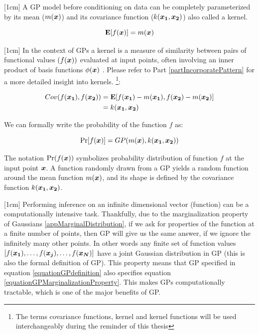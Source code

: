 [1cm]
A GP model before conditioning on data can be completely parameterized by its mean ($m(\boldsymbol{x})$) and its covariance function ($k(\boldsymbol{x_1}, \boldsymbol{x_2})$) also called a kernel. 

\begin{equation}\label{eq:meanGP}
\mathbf{E}[f(\boldsymbol{x})] = m(\boldsymbol{x})
\end{equation}

[1cm]
In the context of GPs a kernel is a measure of similarity between pairs of functional values $(f(\boldsymbol{x}))$ evaluated at input points, often involving an inner product of basis functions $\phi(\boldsymbol{x})$ \cite{bishop2006pattern}. Please refer to Part \ref{partIncorporatePattern} for a more detailed insight into kernels.   \footnote{The terms covariance functions, kernel and kernel functions will be used interchangeably during the reminder of this thesis}:

\begin{align}\label{eq:covarianceGP}
Cov(f(\boldsymbol{x_1}), f(\boldsymbol{x_2})) & = \mathbf{E}[f(\boldsymbol{x_1}) - m(\boldsymbol{x_1}), f(\boldsymbol{x_2}) - m(\boldsymbol{x_2})] \\
& = k(\boldsymbol{x_1}, \boldsymbol{x_2})
\end{align}

We can formally write the probability of the function $f$ as:

\begin{equation}\label{equationGPdefinition}
\Pr[f(\boldsymbol{x})] = GP(m(\boldsymbol{x}), k(\boldsymbol{x_1}, \boldsymbol{x_2}))
\end{equation}

The notation $\Pr(f(\boldsymbol{x}))$ symbolizes probability distribution of function $f$ at the input point $\boldsymbol{x}$. A function randomly drawn from a GP yields a random function around the mean function $m(\boldsymbol{x})$, and its shape is defined by the covariance function $k(\boldsymbol{x_1}, \boldsymbol{x_2})$. 

[1cm]
Performing inference on an infinite dimensional vector (function) can be a computationally intensive task. Thankfully, due to the marginalization property of Gaussians \ref{appMarginalDistribution}, if we ask for properties of the function at a finite number of points, then  GP will give us the same answer, if we ignore the infinitely many other points. In other words any finite set of function values $[f(\boldsymbol{x_1}), \ldots, f(\boldsymbol{x_j}), \ldots, f(\boldsymbol{x_N})]$ have a joint Gaussian distribution in GP (this is also the formal definition of GP). This property means that GP specified in equation \ref{equationGPdefinition} also specifies equation \ref{equationGPMarginalizationProperty}. This makes GPs computationally tractable, which is one of the major benefits of GP. 

